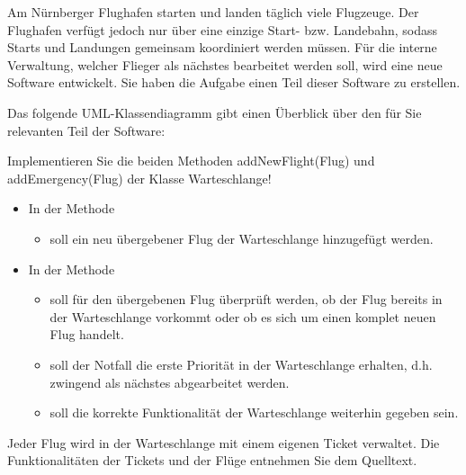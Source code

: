 \documentclass{lehramt-informatik-haupt}
\begin{document}
Am Nürnberger Flughafen starten und landen täglich viele Flugzeuge. Der
Flughafen verfügt jedoch nur über eine einzige Start- bzw. Landebahn,
sodass Starts und Landungen gemeinsam koordiniert werden müssen. Für die
interne Verwaltung, welcher Flieger als nächstes bearbeitet werden soll,
wird eine neue Software entwickelt. Sie haben die Aufgabe einen Teil
dieser Software zu erstellen.

Das folgende UML-Klassendiagramm gibt einen Überblick über den für Sie
relevanten Teil der Software:

Implementieren Sie die beiden Methoden addNewFlight(Flug) und
addEmergency(Flug) der Klasse Warteschlange!

\begin{itemize}
\item In der Methode 

\begin{itemize}
\item soll ein neu übergebener Flug der Warteschlange hinzugefügt werden.
\end{itemize}

\item  In der Methode 

\begin{itemize}
\item soll für den übergebenen Flug überprüft werden, ob der Flug
bereits in der Warteschlange vorkommt oder ob es sich um einen komplet
neuen Flug handelt.

\item soll der Notfall die erste Priorität in der Warteschlange
erhalten, d.h. zwingend als nächstes abgearbeitet werden.

\item soll die korrekte Funktionalität der Warteschlange weiterhin
gegeben sein.
\end{itemize}
\end{itemize}

Jeder Flug wird in der Warteschlange mit einem eigenen Ticket verwaltet.
Die Funktionalitäten der Tickets und der Flüge entnehmen Sie dem
Quelltext.

\begin{antwort}





\end{antwort}

\literatur
\end{document}
